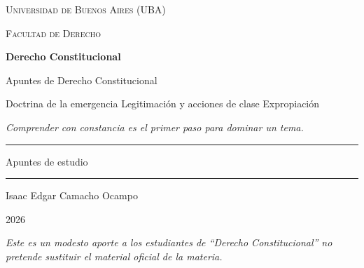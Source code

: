 \documentclass[12pt,oneside]{book}
\newcommand{\universidad}{Universidad de Buenos Aires (UBA)}
\newcommand{\facultad}{Facultad de Derecho}
\newcommand{\materia}{Derecho Constitucional}
\newcommand{\titulo}{Apuntes de Derecho Constitucional}
\newcommand{\subtitulo}{Doctrina de la emergencia \textperiodcentered{} Legitimación y acciones de clase \textperiodcentered{} Expropiación}
\newcommand{\autor}{Isaac Edgar Camacho Ocampo}
\newcommand{\anio}{2026}
\begin{document}
\begin{titlepage}

\thispagestyle{empty}

\begin{center}

\vspace*{1cm}

{\large \textsc{\universidad}}

\vspace{0.2cm}

{\large \textsc{\facultad}}

\vspace{3cm}

{\Huge \textbf{\materia}}

\vspace{1cm}

{\LARGE \titulo}

\vspace{0.4cm}

{\normalsize \subtitulo}

\vspace{0.8cm}

\textit{Comprender con constancia es el primer paso para dominar un tema.}

\vspace{1.2cm}

\rule{0.70\textwidth}{0.5pt}

\vspace{0.5cm}

{\large Apuntes de estudio}

\vspace{0.5cm}

\rule{0.70\textwidth}{0.5pt}

\vfill

{\large \autor}

\vspace{0.3cm}

{\large \anio}

\end{center}

\vfill

\begin{flushleft}
\textit{Este es un modesto aporte a los estudiantes de ``Derecho Constitucional'' no pretende sustituir el material oficial de la materia.}
\end{flushleft}

\end{titlepage}
\end{document}
